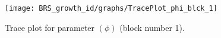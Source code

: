 \begin{figure}[H]
\centering
  \texttt{[image: BRS\_growth\_id/graphs/TracePlot\_phi\_blck\_1]}\\
    \caption{Trace plot for parameter $(\phi)$ (block number 1).}
\end{figure}
